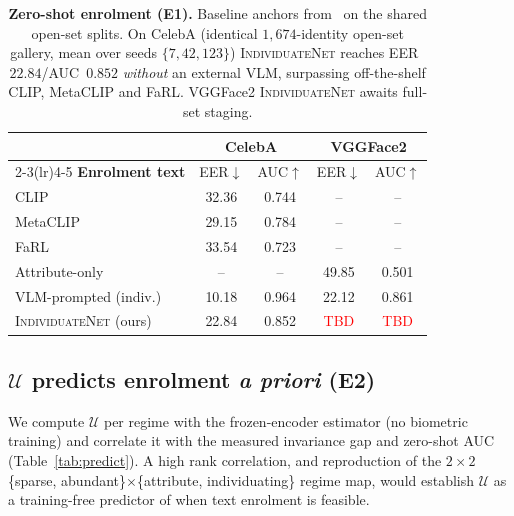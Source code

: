 \documentclass[10pt,twocolumn,letterpaper]{article}
\newcommand{\U}{\mathcal{U}}
\newcommand{\method}{\textsc{IndividuateNet}}
\newcommand{\tbd}{\textcolor{red}{\footnotesize TBD}}
\begin{document}
\begin{table}[t]
  \centering\small
  \setlength{\tabcolsep}{4pt}
  \begin{tabular}{@{}lcccc@{}}
    \toprule
    & \multicolumn{2}{c}{\textbf{CelebA}} & \multicolumn{2}{c}{\textbf{VGGFace2}} \\
    \cmidrule(lr){2-3}\cmidrule(lr){4-5}
    \textbf{Enrolment text} & EER$\downarrow$ & AUC$\uparrow$ & EER$\downarrow$ & AUC$\uparrow$ \\
    \midrule
    CLIP~\cite{clip}            & 32.36 & 0.744 & --    & --    \\
    MetaCLIP                    & 29.15 & 0.784 & --    & --    \\
    FaRL~\cite{farl}            & 33.54 & 0.723 & --    & --    \\
    Attribute-only              & --    & --    & 49.85 & 0.501 \\
    VLM-prompted (indiv.)       & 10.18 & 0.964 & 22.12 & 0.861 \\
    \midrule
    \method{} (ours)            & 22.84 & 0.852 & \tbd  & \tbd  \\
    \bottomrule
  \end{tabular}
  \caption{\textbf{Zero-shot enrolment (E1).} Baseline anchors from~\cite{semanticbio} on the
  shared open-set splits. On CelebA (identical $1{,}674$-identity open-set gallery, mean over
  seeds $\{7,42,123\}$) \method{} reaches EER~$22.84$/AUC~$0.852$ \emph{without} an external VLM,
  surpassing off-the-shelf CLIP, MetaCLIP and FaRL. VGGFace2 \method{} awaits full-set staging.}
  \label{tab:main}
\end{table}

\subsection{$\U$ predicts enrolment \emph{a priori} (E2)}
\label{sec:e2}
We compute $\U$ per regime with the frozen-encoder estimator (no biometric training) and
correlate it with the measured invariance gap and zero-shot AUC (Table~\ref{tab:predict}). A
high rank correlation, and reproduction of the $2\times2$ \{sparse, abundant\}$\times$\{attribute,
individuating\} regime map, would establish $\U$ as a training-free predictor of when text
enrolment is feasible.
\end{document}
